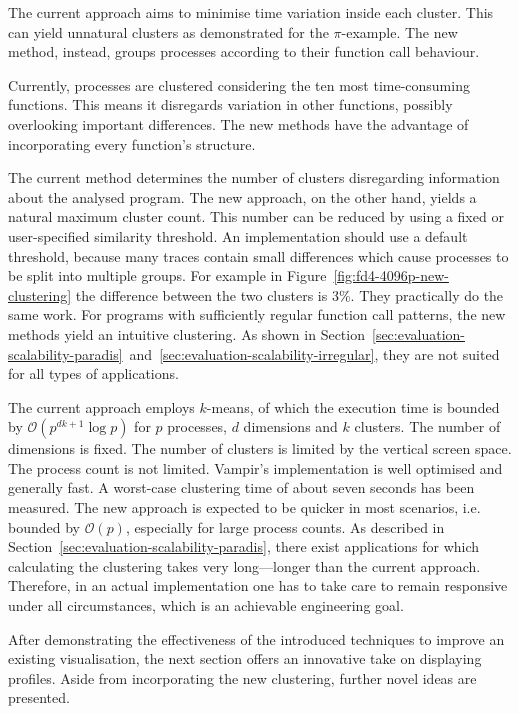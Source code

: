 \documentclass[a4paper, final, diplominf]{zih-template}
\begin{document}
The current approach aims to minimise time variation inside each cluster.
This can yield unnatural clusters as demonstrated for the $\pi$-example.
The new method, instead, groups processes according to their function call behaviour.

Currently, processes are clustered considering the ten most time-consuming functions.
This means it disregards variation in other functions, possibly overlooking important differences.
The new methods have the advantage of incorporating every function's structure.

The current method determines the number of clusters disregarding information about the analysed program.
The new approach, on the other hand, yields a natural maximum cluster count.
This number can be reduced by using a fixed or user-specified similarity threshold.
An implementation should use a default threshold, because many traces contain small differences which cause processes to be split into multiple groups.
For example in Figure~\ref{fig:fd4-4096p-new-clustering} the difference between the two clusters is 3\%.
They practically do the same work.
For programs with sufficiently regular function call patterns, the new methods yield an intuitive clustering.
As shown in Section~\ref{sec:evaluation-scalability-paradis}~and~\ref{sec:evaluation-scalability-irregular}, they are not suited for all types of applications.

The current approach employs $k$-means, of which the execution time is bounded by $\mathcal{O}(p^{dk+1} \log p)$ for $p$ processes, $d$ dimensions and $k$ clusters.
The number of dimensions is fixed.
The number of clusters is limited by the vertical screen space.
The process count is not limited.
Vampir's implementation is well optimised and generally fast.
A worst-case clustering time of about seven seconds has been measured.
The new approach is expected to be quicker in most scenarios, i.e. bounded by $\mathcal{O}(p)$, especially for large process counts.
As described in Section~\ref{sec:evaluation-scalability-paradis}, there exist applications for which calculating the clustering takes very long---longer than the current approach.
Therefore, in an actual implementation one has to take care to remain responsive under all circumstances, which is an achievable engineering goal.

After demonstrating the effectiveness of the introduced techniques to improve an existing visualisation, the next section offers an innovative take on displaying profiles.
Aside from incorporating the new clustering, further novel ideas are presented.
\end{document}
